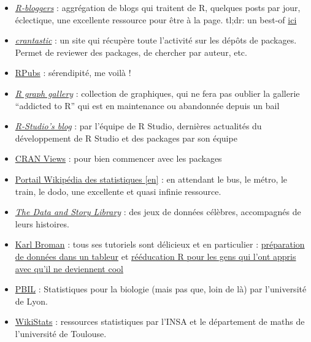\documentclass[
  letterpaper,
  DIV=11,
  numbers=noendperiod]{scrreprt}
\providecommand{\tightlist}{%
  \setlength{\itemsep}{0pt}\setlength{\parskip}{0pt}}\usepackage{longtable,booktabs,array}
\begin{document}
\begin{itemize}
\tightlist
\item
  \href{http://www.r-bloggers.com/}{\emph{R-bloggers}} : aggrégation de
  blogs qui traitent de R, quelques posts par jour, éclectique, une
  excellente ressource pour être à la page. tl;dr: un best-of
  \href{http://www.r-bloggers.com/?s=in+case+you+missed+it}{ici}
\item
  \href{http://crantastic.org/}{\emph{crantastic}} : un site qui
  récupère toute l'activité sur les dépôts de packages. Permet de
  reviewer des packages, de chercher par auteur, etc.
\item
  \href{https://rpubs.com/}{RPubs} : sérendipité, me voilà !
\item
  \href{http://rgraphgallery.blogspot.fr/search/label/map}{\emph{R graph
  gallery}} : collection de graphiques, qui ne fera pas oublier la
  gallerie ``addicted to R'' qui est en maintenance ou abandonnée depuis
  un bail
\item
  \href{http://blog.rstudio.org/}{\emph{R-Studio's blog}} : par l'équipe
  de R Studio, dernières actualités du développement de R Studio et des
  packages par son équipe
\item
  \href{http://cran.r-project.org/web/views/}{CRAN Views} : pour bien
  commencer avec les packages
\item
  \href{https://en.wikipedia.org/wiki/Portal:Statistics}{Portail
  Wikipédia des statistiques {[}en{]}} : en attendant le bus, le métro,
  le train, le dodo, une excellente et quasi infinie ressource.
\item
  \href{http://lib.stat.cmu.edu/DASL/}{\emph{The Data and Story
  Library}} : des jeux de données célèbres, accompagnés de leurs
  histoires.
\item
  \href{http://kbroman.org/pages/tutorials.html}{Karl Broman} : tous ses
  tutoriels sont délicieux et en particulier :
  \href{https://github.com/kbroman/dataorg}{préparation de données dans
  un tableur} et \href{https://github.com/kbroman/hipsteR}{rééducation R
  pour les gens qui l'ont appris avec qu'il ne deviennent cool}
\item
  \href{http://pbil.univ-lyon1.fr/R/}{PBIL} : Statistiques pour la
  biologie (mais pas que, loin de là) par l'université de Lyon.
\item
  \href{http://wikistat.fr/}{WikiStats} : ressources statistiques par
  l'INSA et le département de maths de l'université de Toulouse.
\end{itemize}
\end{document}
